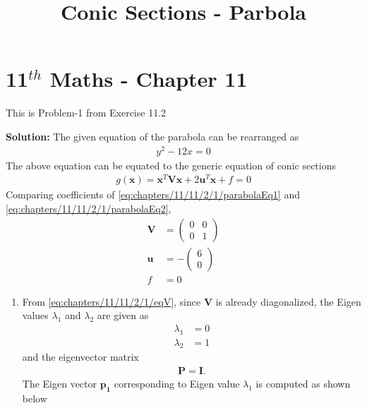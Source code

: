 \documentclass[12pt]{article}
\providecommand{\brak}[1]{\ensuremath{\left(#1\right)}}
\newcommand{\solution}{\noindent \textbf{Solution: }}
\newcommand{\myvec}[1]{\ensuremath{\begin{pmatrix}#1\end{pmatrix}}}
\let\vec\mathbf
\begin{document}
\begin{center}
\title{\textbf{Conic Sections - Parbola}}
\date{\vspace{-5ex}} %
\maketitle
\end{center}
\setcounter{page}{1}

\section{11$^{th}$ Maths - Chapter 11}
This is Problem-1 from Exercise 11.2
\begin{enumerate}
\solution 
\fi
The given equation of the parabola can be rearranged as
\begin{align}
    \label{eq:chapters/11/11/2/1/parabolaEq1}
    y^2-12x = 0
\end{align}
The above equation can be equated to the generic equation of conic sections
\begin{align}
	\label{eq:chapters/11/11/2/1/parabolaEq2}
	g\brak{\vec{x}} = \vec{x}^T\vec{V}\vec{x} + 2\vec{u}^T\vec{x} + f = 0 
\end{align}
Comparing coefficients of \eqref{eq:chapters/11/11/2/1/parabolaEq1} and \eqref{eq:chapters/11/11/2/1/parabolaEq2},
\begin{align}
	\label{eq:chapters/11/11/2/1/eqV}
	\vec{V} &= \myvec{ 0 & 0 \\ 0 & 1} \\
	\label{eq:chapters/11/11/2/1/eqU}
	\vec{u} &= -\myvec{6 \\ 0} \\
	\label{eq:chapters/11/11/2/1/eqF}
	f &= 0 
\end{align}
\begin{enumerate}
\item  
From \eqref{eq:chapters/11/11/2/1/eqV}, since $\vec{V}$ is already diagonalized, the Eigen values $\lambda_1$ and $\lambda_2$ are given as 
\begin{align}
	\label{eq:chapters/11/11/2/1/eqEigen1}
	\lambda_1 &= 0 \\
	\label{eq:chapters/11/11/2/1/eqEigen2}
	\lambda_2 &= 1 
\end{align}
and the eigenvector matrix
\begin{align}
	\vec{P} = \vec{I}.
\end{align}
\iffalse
The Eigen vector $\vec{p_1}$ corresponding to Eigen value $\lambda_1$ is computed as shown below

\end{enumerate}
\end{enumerate}
\end{document}
